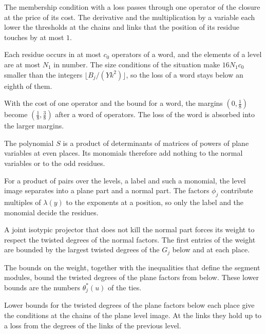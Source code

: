 The membership condition with a loss passes through one operator of the closure at the price of its cost. The
derivative and the multiplication by a variable each lower the thresholds at the chains and links that the position of
its residue touches by at most $1$.

Each residue occurs in at most $c_0$ operators of a word, and the elements of a level are at most $N_1$ in number. The
size conditions of the situation make $16N_1c_0$ smaller than the integers $\lfloor B_j/(Yk^2)\rfloor$, so the loss of a
word stays below an eighth of them.

With the cost of one operator and the bound for a word, the margins $(0,\frac18)$ become $(\frac18,\frac38)$ after a
word of operators. The loss of the word is absorbed into the larger margins.

The polynomial $S$ is a product of determinants of matrices of powers of plane variables at even places. Its monomials
therefore add nothing to the normal variables or to the odd residues.

For a product of pairs over the levels, a label and such a monomial, the level image separates into a plane part and a
normal part. The factors $\phi_j$ contribute multiples of $\lambda(y)$ to the exponents at a position, so only the label and
the monomial decide the residues.

A joint isotypic projector that does not kill the normal part forces its weight to respect the twisted degrees of the normal
factors. The first entries of the weight are bounded by the largest twisted degrees of the $G_j$ below and at each place.

The bounds on the weight, together with the inequalities that define the segment modules, bound the twisted degrees of the
plane factors from below. These lower bounds are the numbers $\theta^*_j(u)$ of the ties.

Lower bounds for the twisted degrees of the plane factors below each place give the conditions at the chains of the plane level
image. At the links they hold up to a loss from the degrees of the links of the previous level.

